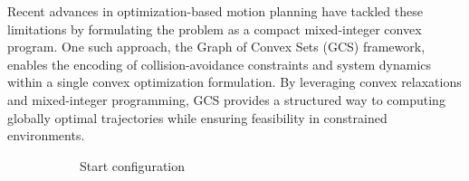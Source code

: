 \documentclass[conference]{IEEEtran}
\begin{document}
Recent advances in optimization-based motion planning have tackled these limitations by formulating the problem as a compact mixed-integer convex program\cite{marcucci2023motion}.
%
One such approach, the Graph of Convex Sets (GCS) framework\cite{marcucci2024shortest}, enables the encoding of collision-avoidance constraints and system dynamics within a single convex optimization formulation.
%
By leveraging convex relaxations and mixed-integer programming, GCS provides a structured way to computing globally optimal trajectories while ensuring feasibility in constrained environments.

\begin{figure}[!t]
    \centering
    \begin{subfigure}[b]{0.19\textwidth}
        \centering
        \captionsetup{justification=centering}
        \caption{Start configuration}
        \label{subfig:cage_start_orbit}
    \end{subfigure}\hspace{0.01\textwidth}
    \begin{subfigure}[b]{0.19\textwidth}
        \centering

\end{subfigure}
\end{figure}
\end{document}
